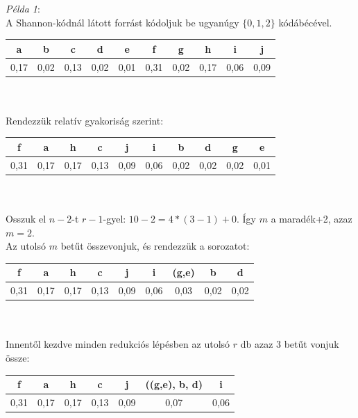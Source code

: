 \documentclass[12pt,margin=0px]{article}
\begin{document}
    \noindent \emph{Példa 1}:\\

    \noindent A Shannon-kódnál látott forrást kódoljuk be ugyanúgy $\{0,1,2\}$ kódábécével.\\

    \noindent \begin{tabular}{|c|c|c|c|c|c|c|c|c|c|}
        \hline a & b & c & d & e & f & g & h & i & j \\
        \hline 0,17 & 0,02 & 0,13 & 0,02 & 0,01 & 0,31 & 0,02 & 0,17 & 0,06 & 0,09 \\
        \hline
    \end{tabular}\\\\
\newpage
    \noindent Rendezzük relatív gyakoriság szerint:\\

    \noindent \begin{tabular}{|c|c|c|c|c|c|c|c|c|c|}
        \hline f & a & h & c & j & i & b & d & g & e \\
        \hline 0,31 & 0,17 & 0,17 & 0,13 & 0,09 & 0,06 & 0,02 & 0,02 & 0,02 & 0,01 \\
        \hline
    \end{tabular}\\\\

    \noindent Osszuk el $n-2$-t $r-1$-gyel: $10-2 = 4*(3-1)+0$. Így $m$ a maradék+2, azaz $m=2$.\\
    Az utolsó $m$ betűt összevonjuk, és rendezzük a sorozatot:\\

    \noindent \begin{tabular}{|c|c|c|c|c|c|c|c|c|}
        \hline f & a & h & c & j & i & (g,e) & b & d  \\
        \hline 0,31 & 0,17 & 0,17 & 0,13 & 0,09 & 0,06 & 0,03 & 0,02 & 0,02 \\
        \hline
    \end{tabular}\\\\

    \noindent Innentől kezdve minden redukciós lépésben az utolsó $r$ db azaz 3 betűt vonjuk össze:\\

    \noindent \begin{tabular}{|c|c|c|c|c|c|c|}
        \hline f & a & h & c & j & ((g,e), b, d) & i  \\
        \hline 0,31 & 0,17 & 0,17 & 0,13 & 0,09 & 0,07 & 0,06  \\
        \hline
    \end{tabular}\\\\
\end{document}
